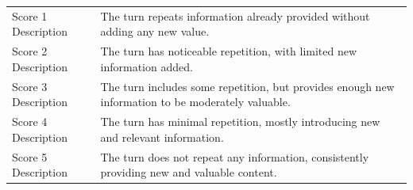 \begin{tabular}{ll}
Score 1 Description  & The turn repeats information already provided without adding any new value.                                                                                             \\
Score 2 Description  & The turn has noticeable repetition, with limited new information added.                                             \\
Score 3 Description  & The turn includes some repetition, but provides enough new information to be moderately valuable.                                                                                                                                 \\
Score 4 Description  & The turn has minimal repetition, mostly introducing new and relevant information.                                                            \\
Score 5 Description  & The turn does not repeat any information, consistently providing new and valuable content.  \\ 
\bottomrule
\end{tabular}